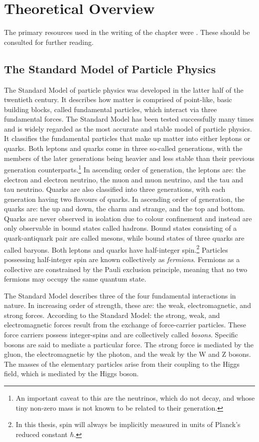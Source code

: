 \chapter{Theoretical Overview}
The primary resources used in the writing of the chapter were \cite{mann,griffiths,sood}. These should be consulted for further reading.
\section{The Standard Model of Particle Physics}
The Standard Model \cite{SM1,SM2,SM3,SM4} of particle physics was developed in the latter half of the twentieth century. It describes how matter is comprised of point-like, basic building blocks, called fundamental particles, which interact via three fundamental forces. The Standard Model has been tested successfully many times and is widely regarded as the most accurate and stable \cite{SM_fit} model of particle physics. It classifies the fundamental particles that make up matter into either leptons or quarks. Both leptons and quarks come in three so-called generations, with the members of the later generations being heavier and less stable than their previous generation counterparts.\footnote{An important caveat to this are the neutrinos, which do not decay, and whose tiny non-zero mass is not known to be related to their generation.} In ascending order of generation, the leptons are: the electron and electron neutrino, the muon and muon neutrino, and the tau and tau neutrino. Quarks are also classified into three generations, with each generation having two flavours of quarks. In ascending order of generation, the quarks are: the up and down, the charm and strange, and the top and bottom. Quarks are never observed in isolation due to colour confinement and instead are only observable in bound states called hadrons. Bound states consisting of a quark-antiquark pair are called mesons, while bound states of three quarks are called baryons. Both leptons and quarks have half-integer spin.\footnote{In this thesis, spin will always be implicitly measured in units of Planck's reduced constant $\hbar$.} Particles possessing half-integer spin are known collectively as \emph{fermions}. Fermions as a collective are constrained by the Pauli exclusion principle, meaning that no two fermions may occupy the same quantum state.

The Standard Model describes three of the four fundamental interactions in nature. In increasing order of strength, these are: the weak, electromagnetic, and strong forces. According to the Standard Model: the strong, weak, and electromagnetic forces result from the exchange of force-carrier particles. These force carriers possess integer-spins  and are collectively called \emph{bosons}. Specific bosons are said to mediate a particular force. The strong force is mediated by the gluon, the electromagnetic by the photon, and the weak by the W and Z bosons. The masses of the elementary particles arise from their coupling to the Higgs field, which is mediated by the Higgs boson.


